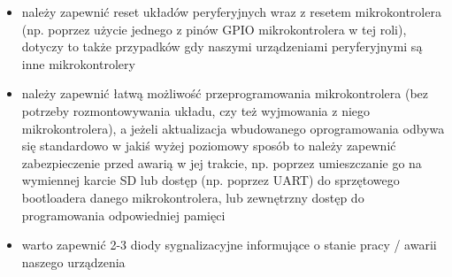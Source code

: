 \begin{itemize}
		\begin{itemize}
			\item należy zapewnić reset układów peryferyjnych wraz z resetem mikrokontrolera (np. poprzez użycie jednego z pinów GPIO mikrokontrolera w tej roli),
				dotyczy to także przypadków gdy naszymi urządzeniami peryferyjnymi są inne mikrokontrolery
			\item należy zapewnić łatwą możliwość przeprogramowania mikrokontrolera (bez potrzeby rozmontowywania układu, czy też wyjmowania z niego mikrokontrolera),
				a jeżeli aktualizacja wbudowanego oprogramowania odbywa się standardowo w jakiś wyżej poziomowy sposób to należy zapewnić zabezpieczenie przed awarią w jej trakcie,
				np. poprzez umieszczanie go na wymiennej karcie SD lub dostęp (np. poprzez UART) do sprzętowego bootloadera danego mikrokontrolera, lub zewnętrzny dostęp do programowania odpowiedniej pamięci
			\item warto zapewnić 2-3 diody sygnalizacyjne informujące o stanie pracy / awarii naszego urządzenia
			

\end{itemize}
\end{itemize}
